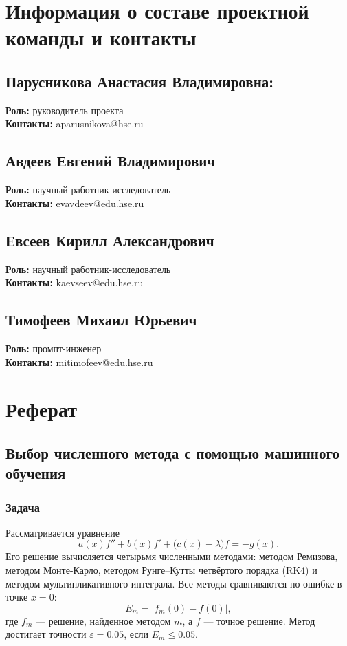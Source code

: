 \documentclass[14pt,a4paper]{extarticle}
\begin{document}
\section*{Информация о составе проектной команды и контакты}
{}

\subsection*{Парусникова Анастасия Владимировна:}
\textbf{Роль:} руководитель проекта\\
\textbf{Контакты:} aparusnikova@hse.ru
\subsection*{Авдеев Евгений Владимирович}
\textbf{Роль:} научный работник-исследователь\\
\textbf{Контакты:} evavdeev@edu.hse.ru
\subsection*{Евсеев Кирилл Александрович}
\textbf{Роль:} научный работник-исследователь\\
\textbf{Контакты:} kaevseev@edu.hse.ru
\subsection*{Тимофеев Михаил Юрьевич}
\textbf{Роль:} промпт-инженер\\
\textbf{Контакты:} mitimofeev@edu.hse.ru
\clearpage

\section*{Реферат}
{}
\subsection*{Выбор численного метода с помощью машинного обучения}
\begingroup
\titlespacing*{\subsubsection}{0pt}{5pt}{2pt}
\subsubsection*{Задача}
Рассматривается уравнение
\[
a(x)f''+b(x)f'+\bigl(c(x)-\lambda\bigr)f=-g(x).
\]
Его решение вычисляется четырьмя численными методами: методом Ремизова,
методом Монте-Карло, методом Рунге--Кутты четвёртого порядка (RK4)
и методом мультипликативного интеграла. Все методы сравниваются
по ошибке в точке $x=0$:
\[
E_m=\bigl|f_m(0)-f(0)\bigr|,
\]
где $f_m$ --- решение, найденное методом $m$, а $f$ --- точное решение.
Метод достигает точности $\varepsilon=0.05$, если $E_m\le0.05$.
\end{document}
